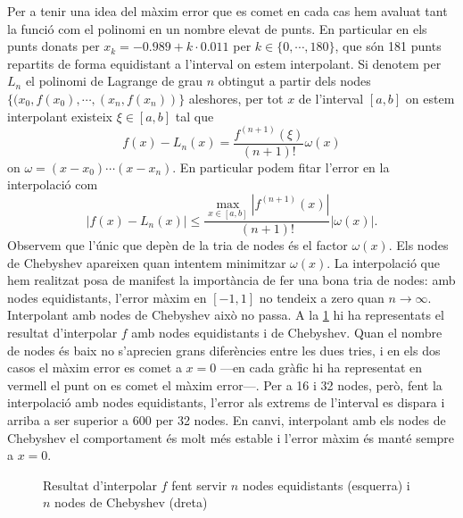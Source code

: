 \documentclass[12pt]{article}
\numberwithin{table}{section}
\numberwithin{figure}{section}
\numberwithin{equation}{section}
\newcommand{\abs}[1]{\left\lvert #1 \right\rvert}
\begin{document}
Per a tenir una idea del màxim error que es comet en cada cas hem avaluat tant la funció com el polinomi en un nombre elevat de punts. En particular en els punts donats per \( x_k = \num{-0.989} + k \cdot \num{0.011} \) per \( k \in \{0, \cdots, 180\} \), que són 181 punts repartits de forma equidistant a l'interval on estem interpolant. Si denotem per \( L_n \) el polinomi de Lagrange de grau \( n \) obtingut a partir dels nodes \( \{(x_0, f(x_0), \cdots , (x_n, f(x_n)) \} \) aleshores, per tot \( x \) de l'interval \( [a,b] \) on estem interpolant existeix \( \xi \in [a,b] \) tal que 
\begin{equation*}
	f(x) - L_n(x) = \frac{f^{(n+1)}(\xi)}{(n+1)!}\omega(x) 
\end{equation*}
on \( \omega = (x-x_0)\cdots(x-x_n) \). En particular podem fitar l'error en la interpolació com
\begin{equation*}
	\abs{f(x) - L_n(x)} \leq \frac{\max_{x \in [a,b]}\abs{f^{(n+1)}(x)}}{(n+1)!}\abs{\omega(x)}.
\end{equation*}
Observem que l'únic que depèn de la tria de nodes és el factor \( \omega(x) \). Els nodes de Chebyshev apareixen quan intentem minimitzar \( \omega(x) \). La interpolació que hem realitzat posa de manifest la importància de fer una bona tria de nodes: amb nodes equidistants, l'error màxim en \( [-1,1] \) no tendeix a zero quan \( n \to \infty \). Interpolant amb nodes de Chebyshev això no passa. A la \cref{fig:interpolacio} hi ha representats el resultat d'interpolar \( f \) amb nodes equidistants i de Chebyshev. Quan el nombre de nodes és baix no s'aprecien grans diferències entre les dues tries, i en els dos casos el màxim error es comet a \( x = 0 \) ---en cada gràfic hi ha representat en vermell el punt on es comet el màxim error---. Per a 16 i 32 nodes, però, fent la interpolació amb nodes equidistants, l'error als extrems de l'interval es dispara i arriba a ser superior a \( 600 \) per 32 nodes. En canvi, interpolant amb els nodes de Chebyshev el comportament és molt més estable i l'error màxim és manté sempre a \( x = 0 \). 

\begin{figure}[p]
	\centering
	\sffamily \footnotesize
	
	
	
	
	\caption{Resultat d'interpolar \( f \) fent servir \( n \) nodes equidistants (esquerra) i \( n \) nodes de Chebyshev (dreta)}
	\label{fig:interpolacio}
\end{figure}
\end{document}
